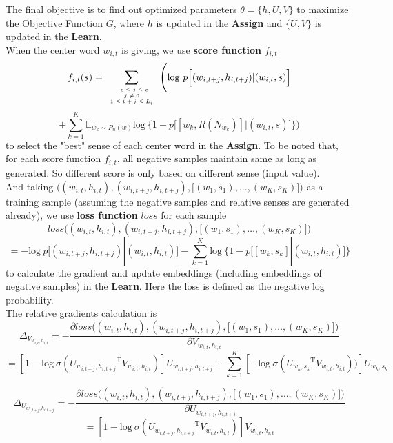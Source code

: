 \documentclass[12pt,a4paper,twoside]{book}
\begin{document}
The final objective is to find out optimized parameters $\theta = \{h,U,V\}$ to maximize the Objective Function $G$, where $h$ is updated in the \textbf{Assign} and $\{U,V\}$ is updated in the \textbf{Learn}.\\

When the center word $w_{i,t}$ is giving, we use \textbf{score function} $f_{i,t}$
$$f_{i,t}(s) = \sum\limits_{\mbox{\tiny$\begin{array}{c}-c\leq j \leq c\\ j\neq 0\\ 1\leq t+j\leq L_i\end{array}$}}\Bigg (\mathrm{log}\ p\Big [(w_{i,t+j},h_{i,t+j})|(w_{i,t},s)\Big ]$$
$$+\sum\limits_{k=1}^K\mathbb{E}_{w_k\sim P_n(w)}\mathrm{log}\ \Big \{1-p\Big[[w_k,R(N_{w_k})]|(w_{i,t},s)\Big ] \Big \} \Bigg )$$
to select the "best" sense of each center word in the \textbf{Assign}. To be noted that, for each score function $f_{i,t}$, all negative samples maintain same as long as generated. So different score is only based on different sense (input value).\\

And taking $\big ( (w_{i,t},h_{i,t}),(w_{i,t+j},h_{i,t+j}),\big [(w_1,s_1),\ldots,(w_K,s_K)\big ]\big )$ as a training sample (assuming the negative samples and relative senses are generated already), we use \textbf{loss function} $loss$ for each sample 
$$loss\bigg ( (w_{i,t},h_{i,t}),(w_{i,t+j},h_{i,t+j}),\big [(w_1,s_1),\ldots,(w_K,s_K)\big ]\bigg )$$
$$ = -\mathrm{log}\ p\Big [(w_{i,t+j},h_{i,t+j})|(w_{i,t},h_{i,t})\Big ]-\sum\limits_{k=1}^K\mathrm{log}\ \Big \{1-p\Big[[w_k,s_k]|(w_{i,t},h_{i,t})\Big ] \Big \}$$
to calculate the gradient and update embeddings (including embeddings of negative samples) in the \textbf{Learn}. Here the loss is defined as the negative log probability. \\

The relative gradients calculation is
$$\Delta_{V_{w_{i,t},h_{i,t}}} = -\frac{\partial loss\bigg ( (w_{i,t},h_{i,t}),(w_{i,t+j},h_{i,t+j}),\big [(w_1,s_1),\ldots,(w_K,s_K)\big ]\bigg )}{\partial V_{w_{i,t},h_{i,t}}} $$
$$= [1-\mathrm{log}\ \sigma({U_{w_{i,t+j},h_{i,t+j}}}^{\mathrm{T}}V_{w_{i,t},h_{i,t}})]
U_{w_{i,t+j},h_{i,t+j}}+\sum_{k=1}^K [-\mathrm{log}\ \sigma({U_{w_k,s_k}}^{\mathrm{T}}V_{w_{i,t},h_{i,t}}))]U_{w_k,s_k}$$

$$\Delta_{U_{w_{i,t+j},h_{i,t+j}}} = -\frac{\partial loss\bigg ( (w_{i,t},h_{i,t}),(w_{i,t+j},h_{i,t+j}),\big [(w_1,s_1),\ldots,(w_K,s_K)\big ]\bigg )}{\partial U_{w_{i,t+j},h_{i,t+j}}}$$
$$=[1-\mathrm{log}\ \sigma({U_{w_{i,t+j},h_{i,t+j}}}^{\mathrm{T}}V_{w_{i,t},h_{i,t}})]
V_{w_{i,t},h_{i,t}}$$
\end{document}
